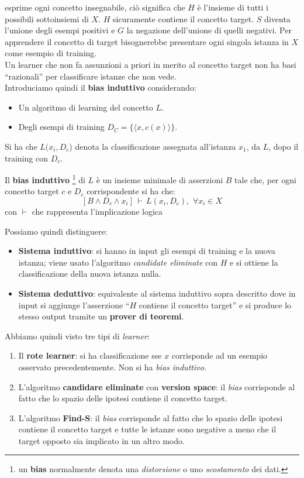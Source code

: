 esprime ogni concetto insegnabile, ciò significa che $H$ è l'insieme di tutti i
possibili sottoinsiemi di $X$. $H$ sicuramente contiene il concetto target. $S$
diventa l'unione degli esempi positivi e $G$ la negazione dell'unione di quelli
negativi. Per apprendere il concetto di target bisognerebbe presentare ogni
singola istanza in $X$ come esempio di training.\\
Un learner che non fa assunzioni a priori in merito al concetto target non ha
basi ``razionali'' per classificare istanze che non vede.\\
Introduciamo quindi il \textbf{bias induttivo} considerando:
\begin{itemize}
  \item Un algoritmo di learning del concetto $L$.
  \item Degli esempi di training $D_C=\{\langle x,c(x)\rangle\}$.
\end{itemize}
Si ha che $L(x_i,D_c$) denota la classificazione assegnata all'istanza $x_1$, da
$L$, dopo il training con $D_c$.
\begin{definizione}
  Il \textbf{bias induttivo} \footnote{un \textbf{bias} normalmente denota una
  \emph{distorsione} o uno \emph{scostamento} dei dati.} di $L$ è un insieme
  minimale di asserzioni $B$ tale 
  che, per ogni concetto target $c$ e $D_c$ corrispondente si ha che:
  \[[B\land D_c\land x_i]\,\vdash\,L(x_i,D_c),\,\,\forall x_i\in X\]
  con $\vdash$ che rappresenta l'implicazione logica
\end{definizione}
Possiamo quindi distinguere:
\begin{itemize}
  \item \textbf{Sistema induttivo}: si hanno in input gli esempi di
  training e la nuova istanza; viene usato l'algoritmo \textit{candidate
    eliminate} con $H$ e si ottiene la classificazione della nuova istanza
  nulla.
  \item \textbf{Sistema deduttivo}: equivalente al sistema induttivo sopra
  descritto dove in input si aggiunge l'asserzione ``$H$ contiene il concetto
  target'' e si produce lo stesso output tramite un \textbf{prover di teoremi}.
\end{itemize}
Abbiamo quindi visto tre tipi di \textit{learner}:
\begin{enumerate}
  \item Il \textbf{rote learner}: si ha classificazione sse $x$ corrisponde
  ad un esempio osservato precedentemente. Non si ha \textit{bias induttivo}.
  \item L'algoritmo \textbf{candidare eliminate} con \textbf{version space}:
  il \textit{bias} corrisponde al fatto che lo spazio delle ipotesi contiene il concetto target. 
  \item L'algoritmo \textbf{Find-S}: il \textit{bias} corrisponde al fatto
  che lo spazio delle ipotesi contiene il concetto target e tutte le istanze
  sono negative a meno che il target opposto sia implicato in un altro modo. 
\end{enumerate}
\newpage
